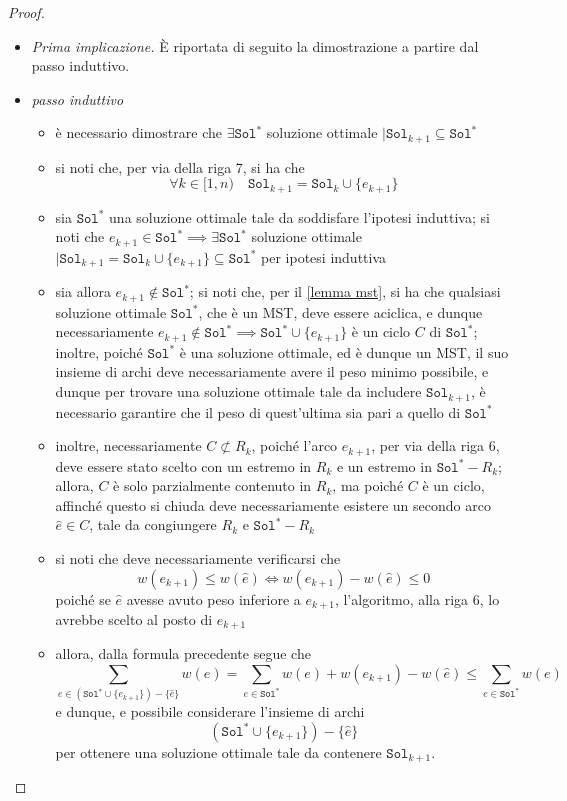 \documentclass[14pt]{extreport}
\theoremstyle{definition}
\theoremstyle{definition}
\begin{document}
\begin{proof}
    \begin{itemize}
        \item[] \textit{Prima implicazione.} È riportata di seguito la dimostrazione a partire dal passo induttivo. 
        \item \textit{passo induttivo}
            \begin{itemize}
                \item è necessario dimostrare che $\exists \texttt{Sol}^*$ soluzione ottimale $\mid \texttt{Sol}_{k + 1} \subseteq \texttt{Sol}^*$
                \item si noti che, per via della riga 7, si ha che $$\forall k \in [1, n) \quad \texttt{Sol}_{k +1} = \texttt{Sol}_k \cup \{e_{k +1}\}$$
                \item sia $\texttt{Sol}^*$ una soluzione ottimale tale da soddisfare l'ipotesi induttiva; si noti che $e_{k +1} \in \texttt{Sol}^* \implies \exists \texttt{Sol}^*$ soluzione ottimale $\mid \texttt{Sol}_{k +1} = \texttt{Sol}_k \cup \{e_{k +1}\} \subseteq \texttt{Sol}^*$ per ipotesi induttiva
                \item sia allora $e_{k +1} \notin \texttt{Sol}^*$; si noti che, per il \cref{lemma mst}, si ha che qualsiasi soluzione ottimale $\texttt{Sol}^*$, che è un MST, deve essere aciclica, e dunque necessariamente $e_{k +1} \notin \texttt{Sol}^* \implies \texttt{Sol}^* \cup \{e_{k +1}\}$ è un ciclo $C$ di $\texttt{Sol}^*$; inoltre, poiché $\texttt{Sol}^*$ è una soluzione ottimale, ed è dunque un MST, il suo insieme di archi deve necessariamente avere il peso minimo possibile, e dunque per trovare una soluzione ottimale tale da includere $\texttt{Sol}_{k + 1}$, è necessario garantire che il peso di quest'ultima sia pari a quello di $\texttt{Sol}^*$
                \item inoltre, necessariamente $C \not \subset R_k$, poiché l'arco $e_{k + 1}$, per via della riga 6, deve essere stato scelto con un estremo in $R_k$ e un estremo in $\texttt{Sol}^* - R_k$; allora, $C$ è solo parzialmente contenuto in $R_k$, ma poiché $C$ è un ciclo, affinché questo si chiuda deve necessariamente esistere un secondo arco $\hat e \in C$, tale da congiungere $R_k$ e $\texttt{Sol}^* - R_k$
                \item si noti che deve necessariamente verificarsi che $$w(e_{k +1}) \le w(\hat e) \iff w(e_{k +1}) - w(\hat e) \le 0$$ poiché se $\hat e$ avesse avuto peso inferiore a $e_{k +1}$, l'algoritmo, alla riga 6, lo avrebbe scelto al posto di $e_{k +1}$
                \item allora, dalla formula precedente segue che $$\displaystyle \sum_{e \in (\texttt{Sol}^* \cup \{e_{k +1}\} )- \{\hat e\} }{w(e)}  = \sum_{e \in \texttt{Sol}^*}{w(e)} + w(e_{k +1}) - w(\hat e) \le \sum_{e \in \texttt{Sol}^*}{w(e)}$$ e dunque, e possibile considerare l'insieme di archi $$(\texttt{Sol}^* \cup \{e_{k+1}\}) - \{\hat e\}$$ per ottenere una soluzione ottimale tale da contenere $\texttt{Sol}_{k + 1}$.
            \end{itemize}


\end{itemize}
\end{proof}
\end{document}
